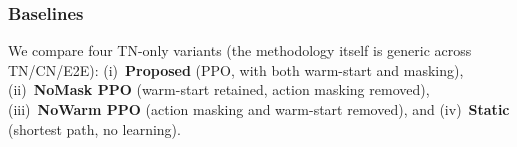 \documentclass[12pt,lettersize,journal,onecolumn]{IEEEtran}
\begin{document}
\subsubsection{Baselines}\label{subsubsec:tn_baselines}
We compare four TN-only variants (the methodology itself is generic across TN/CN/E2E): (i)~\textbf{Proposed} (PPO, with both warm-start and masking), (ii)~\textbf{NoMask PPO} (warm-start retained, action masking removed), (iii)~\textbf{NoWarm PPO} (action masking and warm-start removed), and (iv)~\textbf{Static} (shortest path, no learning).
\end{document}
